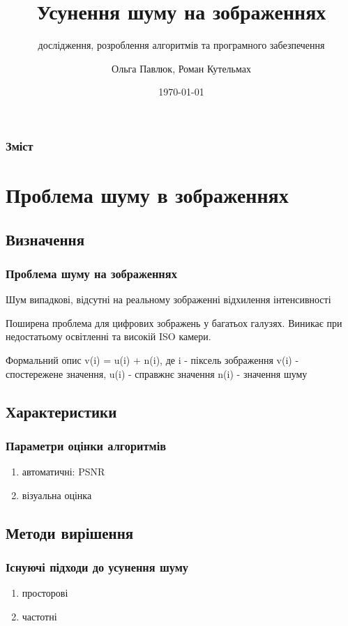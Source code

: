 \documentclass[12pt]{beamer}
\title{Усунення шуму на зображеннях}
\author{Ольга Павлюк, Роман Кутельмах}
\subtitle{{ дослідження,  розроблення алгоритмів та програмного забезпечення}}
\institute{Національний університет "Львівська політехніка", кафедра ПЗ}
\date{\today}
\begin{document}
\begin{frame}
	\titlepage
\end{frame}

\begin{frame}
	\frametitle{Зміст} 
	\tableofcontents
\end{frame}

\section{Проблема шуму в зображеннях}
\subsection{Визначення}
\begin{frame}\frametitle{Проблема шуму на зображеннях}
	\begin{block}{Шум}
	випадкові, відсутні на реальному зображенні відхилення інтенсивності
	\end{block}
	\linebreak
	Поширена проблема для цифрових зображень у багатьох галузях.\linebreak
	Виникає при недостатьому освітленні та високій ISO камери. 
	
	\begin{block}{Формальний опис}
		v(i) = u(i) + n(i), де i - піксель зображення \linebreak
		v(i) - спостережене значення, u(i) - справжнє значення \linebreak
		n(i) - значення шуму 
	\end{block}
\end{frame}

\subsection{Характеристики}
\begin{frame}\frametitle{Параметри оцінки алгоритмів}
	\begin{enumerate}
		\item автоматичні: PSNR
		
		\item візуальна оцінка
	\end{enumerate}
\end{frame}

\subsection{Методи вирішення}
\begin{frame}\frametitle{Існуючі підходи до усунення шуму}
	\begin{enumerate}
		\item просторові\pause
		\item частотні
	\end{enumerate}
\end{frame}
\end{document}
